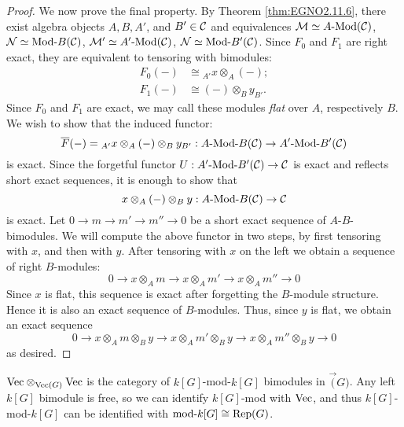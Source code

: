 \documentclass{amsart}
\begin{document}
\begin{proof}
We now prove the final property. By Theorem \ref{thm:EGNO2.11.6}, there exist algebra objects $A, B, A'$, and $B' \in \cC$ and equivalences $\cM \simeq \Mod{A}{}(\cC)$, $\cN \simeq \Mod{}{B}(\cC)$, $\cM' \simeq \Mod{A'}{}(\cC)$, $\cN \simeq \Mod{}{B'}(\cC)$. Since $F_0$ and $F_1$ are right exact, they are equivalent to tensoring with bimodules:
\begin{align*}
	F_0(-) &\cong {}_{A'}x \otimes_A (-); \\
	F_1(-) & \cong (-) \otimes_B y_{B'}.
\end{align*}
Since $F_0$ and $F_1$ are exact, we may call these modules {\em flat} over $A$, respectively $B$. We wish to show that the induced functor:
\begin{equation*}
	\overline{F}(-) = {}_{A'}x \otimes_A (-) \otimes_B y_{B'}: \Mod{A}{B}(\cC) \to \Mod{A'}{B'}(\cC)
\end{equation*}
is exact. Since the forgetful functor $U: \Mod{A'}{B'}(\cC) \to \cC$ is exact and reflects short exact sequences, it is enough to show that 
\begin{equation*}
	x \otimes_A (-) \otimes_B y: \Mod{A}{B}(\cC) \to \cC
\end{equation*}
is exact. Let $0 \to m \to m' \to m'' \to 0$ be a short exact sequence of $A$-$B$-bimodules. We will compute the above functor in two steps, by first tensoring with $x$, and then with $y$. After tensoring with $x$ on the left we obtain a sequence of right $B$-modules:
\begin{equation*}
	0 \to x \otimes_A m \to x \otimes_A m' \to x \otimes_A {m''} \to 0
\end{equation*}
Since $x$ is flat, this sequence is exact after forgetting the $B$-module structure. Hence it is also an exact sequence of $B$-modules. Thus, since $y$ is flat, we obtain an exact sequence
\begin{equation*}
		0 \to x \otimes_A m \otimes_B y \to x \otimes_A m'\otimes_B y \to x \otimes_A {m''}  \otimes_B y \to 0
\end{equation*}
	as desired. 
\end{proof}

\begin{example}
$\Vec \otimes_{\Vec(G)} \Vec$ is the category of $k[G]$-mod-$k[G]$ bimodules in $\Vec(G)$. Any left $k[G]$ bimodule is free, so we can identify $k[G]$-mod with $\Vec$, and thus $k[G]$-mod-$k[G]$ can be identified with $\text{mod-}k[G] \cong \Rep(G)$.
\end{example}
\end{document}
